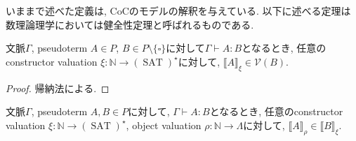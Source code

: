 \documentclass[12pt, titlepage]{ltjsarticle}
\DeclareMathOperator{\SAT}{SAT}
\newcommand{\iprt}[2]{\llbracket {#1} \rrbracket_ {#2}}
\begin{document}
いままで述べた定義は, CoCのモデルの解釈を与えている. 以下に述べる定理は数理論理学においては健全性定理と呼ばれるものである.

\begin{thm}\label{snd1}
 文脈$\Gamma$, pseudoterm $A \in P$, $B \in P \setminus \{\square\}$に対して$\Gamma \vdash A \colon B$となるとき,
 任意のconstructor valuation $\xi : \mathbb{N} \rightarrow (\SAT)^\star$に対して, $\iprt{A}{\xi} \in \mathcal{V}(B)$.
\end{thm}
\begin{proof}
 帰納法による.
\end{proof}

\begin{thm}\label{snd2}
 文脈$\Gamma$, pseudoterm $A, B \in P$に対して, $\Gamma \vdash A \colon B$となるとき,
 任意のconstructor valuation $\xi : \mathbb{N} \rightarrow (\SAT)^\star$, object valuation $\rho : \mathbb{N} \rightarrow \Lambda$に対して, $\iprt{A}{\rho} \in \iprt{B}{\xi}$.
\end{thm}
\end{document}
